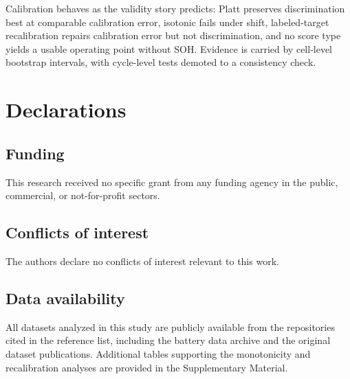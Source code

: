 \documentclass[11pt,a4paper]{article}
\begin{document}
Calibration behaves as the validity story predicts: Platt preserves discrimination best at comparable calibration error, isotonic fails under shift, labeled-target recalibration repairs calibration error but not discrimination, and no score type yields a usable operating point without SOH. Evidence is carried by cell-level bootstrap intervals, with cycle-level tests demoted to a consistency check.

\section*{Declarations}
\subsection*{Funding}
This research received no specific grant from any funding agency in the public, commercial, or not-for-profit sectors.

\subsection*{Conflicts of interest}
The authors declare no conflicts of interest relevant to this work.

\subsection*{Data availability}
All datasets analyzed in this study are publicly available from the repositories cited in the reference list, including the battery data archive and the original dataset publications. Additional tables supporting the monotonicity and recalibration analyses are provided in the Supplementary Material.
\end{document}
